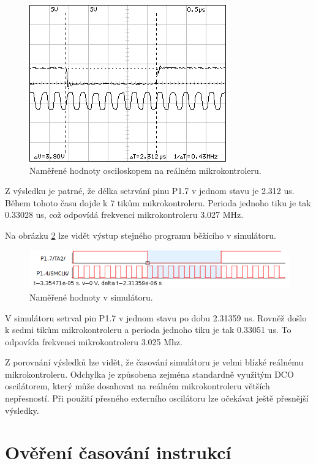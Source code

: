 \begin{figure}[ht]
\centering
\includegraphics[trim=0cm 0cm 0cm 0cm, scale=1]{fig/dso04}
\caption{Naměřené hodnoty osciloskopem na reálném mikrokontroleru.}
\label{fig:dso04osc}
\end{figure}

Z výsledku je patrné, že délka setrvání pinu P1.7 v jednom stavu je 2.312 us. Během tohoto času dojde k 7 tikům mikrokontroleru. Perioda jednoho tiku je tak 0.33028 us, což odpovídá frekvenci mikrokontroleru 3.027 MHz.

Na obrázku \ref{fig:dso04sim} lze vidět výstup stejného programu běžícího v simulátoru.

\begin{figure}[ht]
\centering
\includegraphics[trim=0cm 0cm 0cm 0cm, scale=0.8]{fig/dso04sim}
\caption{Naměřené hodnoty v simulátoru.}
\label{fig:dso04sim}
\end{figure}

V simulátoru setrval pin P1.7 v jednom stavu po dobu 2.31359 us. Rovněž došlo k sedmi tikům mikrokontroleru a perioda jednoho tiku je tak 0.33051 us. To odpovída frekvenci mikrokontroleru 3.025 Mhz.

Z porovnání výsledků lze vidět, že časování simulátoru je velmi blízké reálnému mikrokontroleru. Odchylka je způsobena zejména standardně využitým DCO oscilátorem, který může dosahovat na reálném mikrokontroleru větších nepřesností. Při použití přesného externího oscilátoru lze očekávat ještě přesnější výsledky.

\section{Ověření časování instrukcí}
\label{test2}

